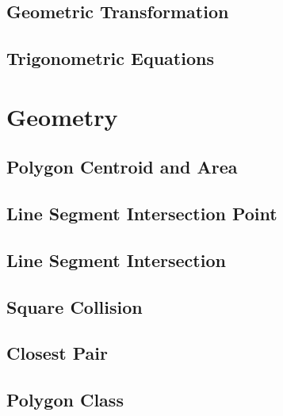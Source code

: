 \subsection{Geometric Transformation}


\subsection{Trigonometric Equations}


\section{Geometry}

\subsection{Polygon Centroid and Area}


\subsection{Line Segment Intersection Point}


\subsection{Line Segment Intersection}


\subsection{Square Collision}


\subsection{Closest Pair}


\subsection{Polygon Class}


